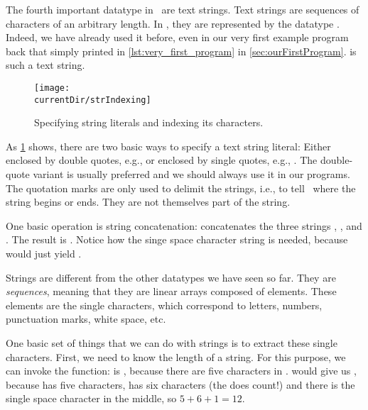 %
\label{sec:str}%
%
The fourth important datatype in \python\ are text strings.
Text strings are sequences of characters of an arbitrary length.
In \python, they are represented by the datatype .
Indeed, we have already used it before, even in our very first example program back that simply printed  in \cref{lst:very_first_program} in \cref{sec:ourFirstProgram}.
 is such a text string.%
%
%
%
\begin{figure}%
\centering%
\texttt{[image: \\currentDir/strIndexing]}%
\caption{Specifying string literals and indexing its characters.}%
\label{fig:strIndexing}%
\end{figure}%
%
As \cref{fig:strIndexing} shows, there are two basic ways to specify a text string literal:
Either enclosed by double quotes, e.g., \pythonIdx{\textquotedbl} or enclosed by single quotes, e.g., \pythonIdx{\textquotesingle}.
The double-quote variant is usually preferred and we should always use it in our programs.
The quotation marks are only used to delimit the strings, i.e., to tell \python\ where the string begins or ends.
They are not themselves part of the string.

One basic operation is string concatenation\pythonIdx{+}:
\pythonIdx{\textquotedbl}\pythonIdx{\textquotesingle} concatenates the three strings , , and .
The result is \pythonIdx{\textquotedbl}.
Notice how the singe space character string is needed, because  would just yield .

Strings are different from the other datatypes we have seen so far.
They are \emph{sequences}, meaning that they are linear arrays composed of elements.
These elements are the single characters, which correspond to letters, numbers, punctuation marks, white space, etc.

One basic set of things that we can do with strings is to extract these single characters.
First, we need to know the length of a string.
For this purpose, we can invoke the  function:
 is , because there are five characters in .
 would give us , because  has five characters,  has six characters (the  does count!) and there is the single space character in the middle, so $5+6+1=12$.

